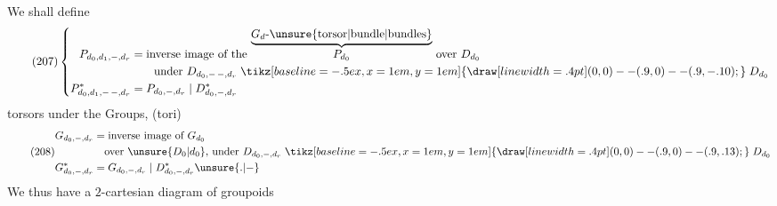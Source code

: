 We shall define
\[
\tag{207}
\left\{\begin{aligned}
P_{d_0,d_1,-,d_r}&=\text{inverse image of the }\overset{\underbrace{G_d\text{-}\unsure{\text{torsor}|\text{bundle}|\text{bundles}}}}{P_{d_0}}\text{ over }D_{d_0}\\
&\qquad\text{under }D_{d_0,\mathord{-\, -},d_r}\mathrel{\tikz[baseline=-.5ex,x=1em,y=1em]{\draw[line width=.4pt] (0,0)--(.9,0)--(.9,-.10);}} D_{d_0}\\
P^*_{d_0,d_1,\mathord{-\, -},d_r}&=P_{d_0,-,d_r}\mid D^*_{d_0,-,d_r}
\end{aligned}\right.
\]
 torsors under the Groups, 
(tori)
\[
\tag{208}
\begin{aligned}
G_{d_0,-,d_r}&=\text{inverse image of }G_{d_0}\\
&\quad\text{over }\unsure{D_0|d_0}\text{, under }D_{d_0,-,d_r}\mathrel{\tikz[baseline=-.5ex,x=1em,y=1em]{\draw[line width=.4pt] (0,0)--(.9,0)--(.9,.13);}} D_{d_0}\\
G^*_{d_0,-,d_r}&=G_{d_0,-,d_r}\mid D^*_{d_0,-,d_r}\unsure{.|-}
\end{aligned}
\]
We thus have a $2$-cartesian diagram of groupoids
